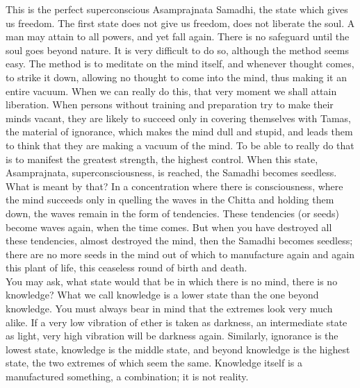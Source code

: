 This is the perfect superconscious Asamprajnata Samadhi, the
state which gives us freedom. The first state does not give us freedom,
does not liberate the soul. A man may attain to all powers, and yet
fall again. There is no safeguard until the soul goes beyond nature. It
is very difficult to do so, although the method seems easy. The method
is to meditate on the mind itself, and whenever thought comes, to
strike it down, allowing no thought to come into the mind, thus making
it an entire vacuum. When we can really do this, that very moment we
shall attain liberation. When persons without training and preparation
try to make their minds vacant, they are likely to succeed only in
covering themselves with Tamas, the material of ignorance, which makes
the mind dull and stupid, and leads them to think that they are making
a vacuum of the mind. To be able to really do that is to
manifest the greatest strength, the highest control. When this state,
Asamprajnata, superconsciousness, is reached, the Samadhi becomes
seedless. What is meant by that? In a concentration where there is
consciousness, where the mind succeeds only in quelling the waves in
the Chitta and holding them down, the waves remain in the form of
tendencies. These tendencies (or seeds) become waves again, when the
time comes. But when you have destroyed all these tendencies, almost
destroyed the mind, then the Samadhi becomes seedless; there are no
more seeds in the mind out of which to manufacture again and again this
plant of life, this ceaseless round of birth and death. \\

You may ask, what state would that be in which there is no
mind, there is no knowledge? What we call knowledge is a lower state
than the one beyond knowledge. You must always bear in mind that the
extremes look very much alike. If a very low vibration of ether is
taken as darkness, an intermediate state as light, very high vibration
will be darkness again. Similarly, ignorance is the lowest state,
knowledge is the middle state, and beyond knowledge is the highest
state, the two extremes of which seem the same. Knowledge itself is a
manufactured something, a combination; it is not reality. \\

